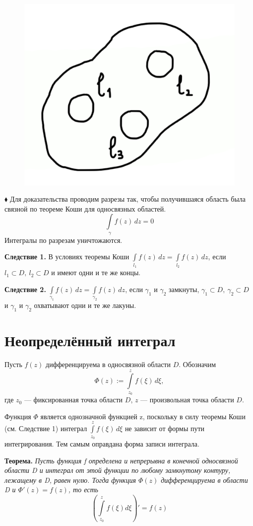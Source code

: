 \documentclass[a4paper, 12pt]{report}
\begin{document}
\begin{figure} 
\vspace{-6ex}
    \includegraphics[width=5 cm]{koshi.png}
\end{figure}

$\blacklozenge$ \hspace{1 mm}
Для доказательства проводим разрезы так, чтобы получившаяся область была связной по теореме Коши для односвязных областей.
$$\int\limits_\gamma f(z)\,dz = 0 $$
Интегралы по разрезам уничтожаются. \quad \blacksquare
\par\bigskip

\textbf{Следствие 1.} \quad
В условиях теоремы Коши $\int\limits_{l_1} f(z)\,dz = \int\limits_{l_2} f(z)\,dz$, если $l_1 \subset D,\ l_2 \subset D$ и имеют одни и те же концы.
\par\bigskip

\textbf{Следствие 2.} \quad
$\int\limits_{\gamma_1}f(z)\,dz = \int\limits_{\gamma_2}f(z)\,dz$, если $\gamma_1$ и $\gamma_2$ замкнуты, $\gamma_1 \subset D,\ \gamma_2 \subset D$ и $\gamma_1$ и $\gamma_2$ охватывают одни и те же лакуны.


\section{Неопределённый интеграл}
Пусть $f(z)$ дифференцируема в односвязной области $D$. Обозначим
$$\Phi(z) := \int\limits_{z_0}^z f(\xi)\,d\xi,$$
где $z_0$ --- фиксированная точка области $D$, $z$ --- произвольная точка области $D$.
\par\bigskip Функция $\Phi$ является однозначной функцией z, поскольку в силу теоремы Коши \\(см. Следствие 1) интеграл $\int\limits_{z_0}^{z} f(\xi)\,d\xi$ не зависит от формы пути интегрирования. Тем самым оправдана форма записи интеграла.
\par\bigskip

\textbf{Теорема.} \quad \textit{Пусть функция f определена и непрерывна в конечной односвязной области D и интеграл от этой функции по любому замкнутому контуру, лежащему в D, равен нулю. Тогда функция $\Phi(z)$ дифференцируема в области D и $\Phi'(z)=f(z)$, то есть}
$$\left( \int\limits_{z_0}^z f(\xi)d\xi \right) ' = f(z)$$
\end{document}
